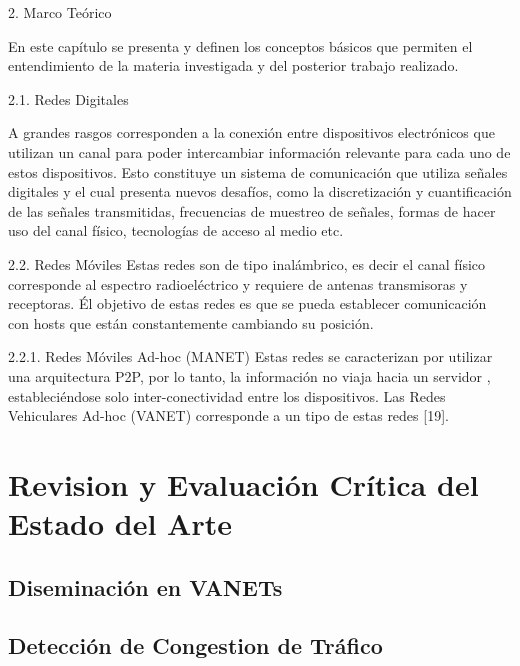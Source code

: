 2.	Marco Teórico

En este capítulo se presenta y definen los conceptos básicos que permiten el entendimiento de la materia investigada y del posterior trabajo realizado.

2.1.	Redes Digitales

A grandes rasgos corresponden  a la conexión  entre dispositivos electrónicos que utilizan un canal para poder intercambiar información relevante para cada uno de estos dispositivos. Esto constituye un sistema de comunicación que utiliza señales digitales y el cual presenta nuevos desafíos, como la discretización y cuantificación de las señales transmitidas, frecuencias de muestreo de señales, formas de hacer uso del canal físico, tecnologías de acceso al medio etc. 

2.2.	Redes Móviles
Estas redes son de tipo inalámbrico, es decir el canal físico corresponde al espectro radioeléctrico y requiere de antenas transmisoras y receptoras. Él objetivo de estas redes es que se pueda establecer comunicación con hosts que están constantemente cambiando su posición. 

2.2.1.	Redes Móviles Ad-hoc (MANET)
Estas redes se caracterizan por utilizar una arquitectura P2P, por  lo tanto, la información no viaja hacia un servidor , estableciéndose solo inter-conectividad entre los dispositivos. Las Redes Vehiculares Ad-hoc (VANET) corresponde a un tipo de estas redes  [19].



\section{Revision y Evaluación Crítica del Estado del Arte}

\subsection{Diseminación en VANETs}

\subsection{Detección de Congestion de Tráfico}

